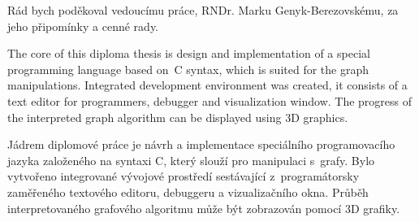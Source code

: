 \documentclass[11pt,twoside,a4paper]{book}
\begin{document}




\coverpagestarts



\acknowledgements
\noindent

\noindent Rád bych poděkoval vedoucímu práce, RNDr. Marku Genyk-Berezovskému, za jeho při\-po\-mín\-ky a cenné rady.






\abstractpage
The core of this diploma thesis is design and implementation of a special programming language based on~C syntax, which is suited for the graph manipulations. Integrated development environment was created, it consists of a text editor for programmers, debugger and visualization window. The progress of the interpreted graph algorithm can be displayed using 3D graphics.


\vspace{8ex}

\noindent
Jádrem diplomové práce je návrh a implementace speciálního programovacího jazyka za\-lo\-že\-né\-ho na syntaxi C, který slouží pro manipulaci s~grafy. Bylo vytvořeno integrované vývojové prostředí sestávající z~programátorsky zaměřeného textového editoru, debuggeru a vizualizačního okna. Průběh interpretovaného grafového algoritmu může být zobrazován pomocí 3D grafiky.
\end{document}
